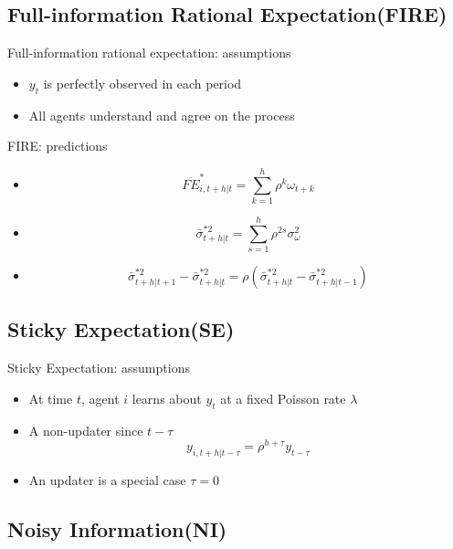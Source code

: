 \documentclass{beamer}
\begin{document}
\subsection{Full-information Rational Expectation(FIRE)}

\begin{frame}{Full-information rational expectation: assumptions}
\begin{itemize}
	\item $y_t$ is perfectly observed in each period
	\item All agents understand and agree on the process 
\end{itemize}
\end{frame}

\begin{frame}{FIRE: predictions}
\begin{itemize}
	\item  $$\overline{FE}^{*}_{i,t+h|t} = \sum^{h}_{k=1} \rho^k \omega_{t+k}$$
	\item  $$\bar \sigma^{*2}_{t+h|t} = \sum^{h}_{s=1}\rho^{2s} \sigma^2_{\omega}$$
	\item 	
	$$\bar \sigma^{*2}_{t+h|t+1} - \bar \sigma^{*2}_{t+h|t}  =  \rho (\bar \sigma^{*2}_{t+h|t} - \bar \sigma^{*2}_{t+h|t-1})$$
\end{itemize}
\end{frame}


\subsection{Sticky Expectation(SE)}


\begin{frame}{Sticky Expectation: assumptions}
\begin{itemize}
	\item At time $t$, agent $i$ learns about $y_t$ at a fixed Poisson rate $\lambda$ 
	\item A non-updater since $t-\tau$  
	$$y_{i,t+h|t-\tau}=\rho^{h+\tau} y_{t-\tau} $$
	\item An updater is a special case  $\tau=0$ 
\end{itemize}
\end{frame}



\subsection{Noisy Information(NI)}
\end{document}

